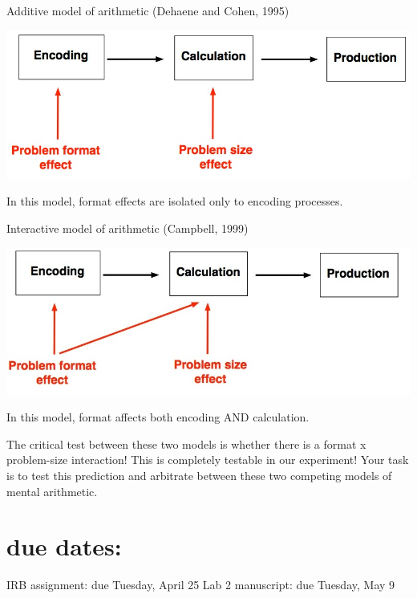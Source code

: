 \documentclass[article,10pt]{article}
\begin{document}
Additive model of arithmetic (Dehaene and Cohen, 1995)

\includegraphics[width=.9\linewidth]{figures/dehaene1.jpg}

In this model, format effects are isolated only to encoding processes.

Interactive model of arithmetic (Campbell, 1999)

\includegraphics[width=.9\linewidth]{figures/campbell1.jpeg}

In this model, format affects both encoding AND calculation.

The critical test between these two models is whether there is a format x problem-size interaction!  This is completely testable in our experiment!  Your task is to test this prediction and arbitrate between these two competing models of mental arithmetic.

\section*{due dates:}
\label{sec-5}

IRB assignment: due Tuesday, April 25
Lab 2 manuscript: due Tuesday, May 9
\end{document}
